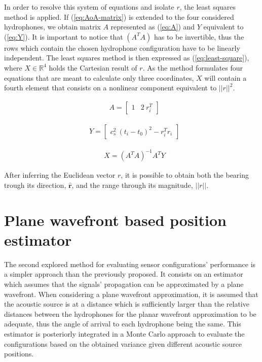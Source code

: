 In order to resolve this system of equations and isolate $r$, the least squares method is applied. If (\ref{eq:AoA-matrix}) is extended to the four considered hydrophones, we obtain matrix $A$ represented as (\ref{eq:A}) and $Y$ equivalent to (\ref{eq:Y}). It is important to notice that $(A^TA)$ has to be invertible, thus the rows which contain the chosen hydrophone configuration have to be linearly independent. The least squares method is then expressed as (\ref{eq:least-square}), where $X \in \mathbb{R}^{4}$ holds the Cartesian result of $r$. As the method formulates four equations that are meant to calculate only three coordinates, $X$ will contain a fourth element that consists on a nonlinear component equivalent to $||r||^{2}$.

\begin{eqnarray}
	& A = 
	\begin{bmatrix}
		1 & 2\: r_i^{T}
	\end{bmatrix}
	\label{eq:A}
\end{eqnarray}

\begin{eqnarray}
	& Y = 
	\begin{bmatrix}
		c_s^{2}\: (t_i-t_0)^2 - r_i^{T} r_i
	\end{bmatrix}
	\label{eq:Y}
\end{eqnarray}

\begin{eqnarray}
	& X = (A^{T}A)^{-1}A^{T}Y
	\label{eq:least-square}
\end{eqnarray}

After inferring the Euclidean vector $r$, it is possible to obtain both the bearing trough its direction, $\hat{\boldsymbol{r}}$, and the range through its magnitude, $||r||$.

\section{Plane wavefront based position estimator}

The second explored method for evaluating sensor configurations' performance is a simpler approach than the previously proposed. It consists on an estimator which assumes that the signals' propagation can be approximated by a plane wavefront. When considering a plane wavefront approximation, it is assumed that the acoustic source is at a distance which is sufficiently larger than the relative distances between the hydrophones for the planar wavefront approximation to be adequate, thus the angle of arrival to each hydrophone being the same. This estimator is posteriorly integrated in a Monte Carlo approach to evaluate the configurations based on the obtained variance given different acoustic source positions.


